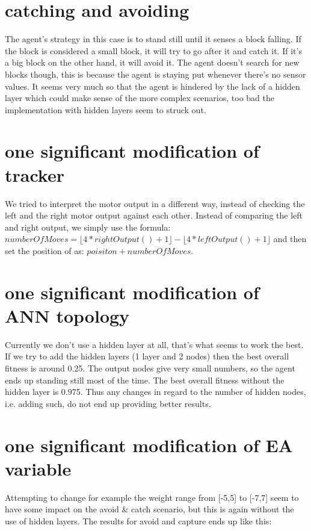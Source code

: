 \documentclass[12pt, a4paper]{article}
\begin{document}
\section{catching and avoiding}
The agent's strategy in this case is to stand still until it senses a block falling. If the block is considered a small block, it will try to go after it and catch it. If it's a big block on the other hand, it will avoid it. The agent doesn't search for new blocks though, this is because the agent is staying put whenever there's no sensor values. It seems very much so that the agent is hindered by the lack of a hidden layer which could make sense of the more complex scenarios, too bad the implementation with hidden layers seem to struck out. 

\section{one significant modification of tracker}
We tried to interpret the motor output in a different way, instead of checking the left and the right motor output against each other. Instead of comparing the left and right output, we simply use the formula:\\ $numberOfMoves = \lfloor 4*rightOutput()+1 \rfloor - \lfloor 4*leftOutput()+1 \rfloor$
and then set the position of as: $ poisiton + numberOfMoves $.

\section{one significant modification of ANN topology}
Currently we don't use a hidden layer at all, that's what seems to work the best. If we try to add the hidden layers (1 layer and 2 nodes) then the best overall fitness is around 0.25. The output nodes give very small numbers, so the agent ends up standing still most of the time. The best overall fitness without the hidden layer is 0.975. Thus any changes in regard to the number of hidden nodes, i.e. adding such, do not end up providing better results.

\section{one significant modification of EA variable}
Attempting to change for example the weight range from [-5,5] to [-7,7] seem to have some impact on the avoid \& catch scenario, but this is again without the use of hidden layers. The results for avoid and capture ends up like this:
\end{document}
